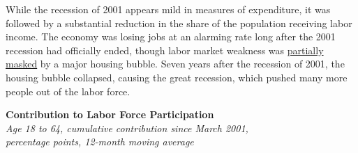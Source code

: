 \documentclass{report}
\makeatletter
\newcommand*\short[1]{\expandafter\@gobbletwo\number\numexpr#1\relax}
\newcommand{\absnode}[3]{\node[below right, align=left] at (axis cs: #1,#2) {#3};}
\newcommand{\dateaxisticks}{
		date coordinates in=x, axis line style={draw=none},
		xmax={2024-01-31},
		max space between ticks=40,	    
		xtick={{1990-01-01}, {1992-01-01}, {1994-01-01}, 
			{1996-01-01}, {1998-01-01}, {2000-01-01}, 
			{2002-01-01}, {2004-01-01}, {2006-01-01},
			{2008-01-01}, {2010-01-01}, {2012-01-01}, {2014-01-01},
		    {2016-01-01}, {2018-01-01}, {2020-01-01}, {2022-01-01}, 
		    {2024-01-01}, {2026-01-01}},
		minor xtick={{1989-01-01}, {1991-01-01}, {1993-01-01},
			{1995-01-01}, {1997-01-01}, {1999-01-01}, 
			{2001-01-01}, {2003-01-01}, {2005-01-01}, {2007-01-01},
		    {2009-01-01}, {2011-01-01}, {2013-01-01}, {2015-01-01},
		    {2017-01-01}, {2019-01-01}, {2021-01-01}, {2023-01-01}, 
		    {2025-01-01}, {2027-01-01}},
		enlarge y limits={0.06}, enlarge x limits={0.01},
		xticklabel style={align=center, yshift=-2pt}, tick label style={inner sep=0pt},
		}
\newcommand{\bbar}[2]{extra #1 ticks = {{#2}}, extra #1 tick labels = ,
		extra #1 tick style = {grid=major, grid style={thick, black!25}},}
\newcommand{\stdline}[4]{\addplot[very thick, no markers, color=#1] 
		table [x=#2, y=#3, col sep=comma] {#4};	}
\newcommand{\thickline}[4]{\addplot[ultra thick, no markers, color=#1] 
		table [x=#2, y=#3, col sep=comma] {#4};	}
\newcommand{\rebars}{
		\fill[color=black!10] (axis cs:{2007-12-01},\pgfkeysvalueof{/pgfplots/ymin}) 
			rectangle (axis cs:{2009-07-01}, \pgfkeysvalueof{/pgfplots/ymax});
		\fill[color=black!10] (axis cs:{2001-03-01},\pgfkeysvalueof{/pgfplots/ymin}) 
			rectangle (axis cs:{2001-11-01}, \pgfkeysvalueof{/pgfplots/ymax});
		\fill[color=black!10] (axis cs:{2020-02-01},\pgfkeysvalueof{/pgfplots/ymin}) 
			rectangle (axis cs:{2020-05-01}, \pgfkeysvalueof{/pgfplots/ymax});}
\makeatother
\begin{document}
{\begin{minipage}{0.28\textwidth}
\end{minipage} \hspace{5mm}
\begin{minipage}{0.44\textwidth}
\small 
\end{minipage}
\vspace{1mm}

\begin{minipage}{1.0\textwidth}
\small While the recession of 2001 appears mild in measures of expenditure, it was followed by a substantial reduction in the share of the population receiving labor income. The economy was losing jobs at an alarming rate long after the 2001 recession had officially ended, though labor market weakness was \href{https://www.aeaweb.org/articles?id=10.1257/jep.30.2.179}{partially masked} by a major housing bubble. Seven years after the recession of 2001, the housing bubble collapsed, causing the great recession, which pushed many more people out of the labor force.
\end{minipage}

\begin{minipage}{0.28\textwidth}
\small  
\end{minipage} \hspace{5mm}
\begin{minipage}{0.48\textwidth}
\normalsize \textbf{Contribution to Labor Force Participation}\\
\footnotesize{\textit{Age 18 to 64, cumulative contribution since March 2001,}}\\
\footnotesize{\textit{percentage points, 12-month moving average}}
\vspace{5.7cm}

\hspace{2mm} 


\end{minipage}}
\end{document}
